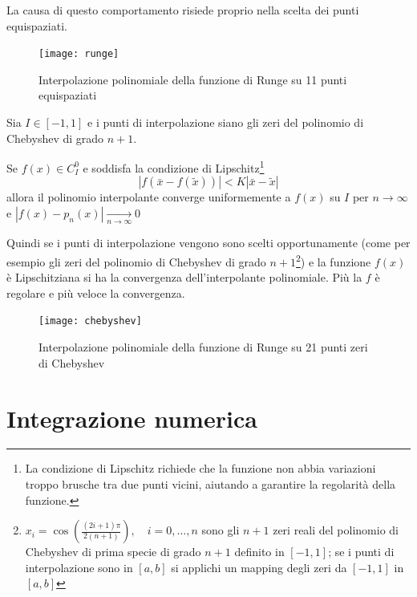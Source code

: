 \documentclass{article}
\begin{document}
La causa di questo comportamento risiede proprio nella scelta dei punti
equispaziati.
\begin{figure}[ht]
    \centering
    \texttt{[image: runge]}
    \caption{Interpolazione polinomiale della funzione di Runge su 11 punti
    equispaziati}
\end{figure}
\begin{theorem}
    Sia $I\in[-1,1]$ e i punti di interpolazione siano gli zeri del polinomio
    di Chebyshev di grado $n+1$.

    Se $f(x)\in C_{I}^0$ e soddisfa la condizione di Lipschitz\footnote{
        La condizione di Lipschitz richiede che la funzione non abbia
        variazioni troppo brusche tra due punti vicini, aiutando a garantire
        la regolarità della funzione.
    }
    $$\left\lvert f(\bar{x}-f(\tilde{x}))\right\rvert< K \left\lvert
    \bar{x}-\tilde{x}\right\rvert$$
    allora il polinomio interpolante converge uniformemente a $f(x)$ su $I$
    per $n\to\infty$ e $\left\lvert
    f(x)-p_n(x)\right\rvert\underset{n\rightarrow\infty}{\to}0$
\end{theorem}
Quindi se i punti di interpolazione vengono sono scelti opportunamente (come per esempio
gli zeri del polinomio di Chebyshev di grado $n+1$\footnote{
    $x_i=\cos(\frac{(2i+1)\pi}{2(n+1)}),\quad i=0,\ldots,n$ sono gli $n+1$
    zeri reali del polinomio di Chebyshev di prima specie di grado $n+1$
    definito in $[-1,1]$; se i punti di interpolazione sono in $[a,b]$ si
    applichi un mapping degli zeri da $[-1,1]$ in $[a,b]$
}) e la funzione $f(x)$ è Lipschitziana si ha la convergenza dell'interpolante
polinomiale. Più la $f$ è regolare e più veloce la convergenza.
\begin{figure}[ht]
    \centering
    \texttt{[image: chebyshev]}
    \caption{Interpolazione polinomiale della funzione di Runge su 21 punti zeri
    di Chebyshev}
\end{figure}
\newpage
\section{Integrazione numerica}
\end{document}
